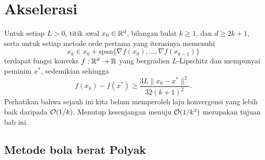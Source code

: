 \chapter{Akselerasi}

Untuk setiap \(L>0\), titik awal \(x_0\in\mathbb{R}^d\), bilangan bulat \(k\geq1\), dan \(d\geq2k+1\), serta untuk setiap metode orde pertama yang iterasinya memenuhi
\begin{equation}
    x_k\in x_0+\mathrm{span}\{\nabla f(x_0),\dots,\nabla f(x_{k-1})\}
\end{equation}
terdapat fungsi konveks \(f:\mathbb{R}^d\rightarrow\mathbb{R}\) yang bergradien \(L\)-Lipschitz dan mempunyai peminim \(x^*\), sedemikian sehingga
\begin{equation}
    f(x_k)-f(x^*)\geq\frac{3L\|x_0-x^*\|^2}{32(k+1)^2}.
\end{equation}
Perhatikan bahwa sejauh ini kita belum memperoleh laju konvergensi yang lebih baik daripada \(\mathcal{O}(1/k)\). Menutup kesenjangan menuju \(\mathcal{O}(1/k^2)\) merupakan tujuan bab ini.

\section{Metode bola berat Polyak}

